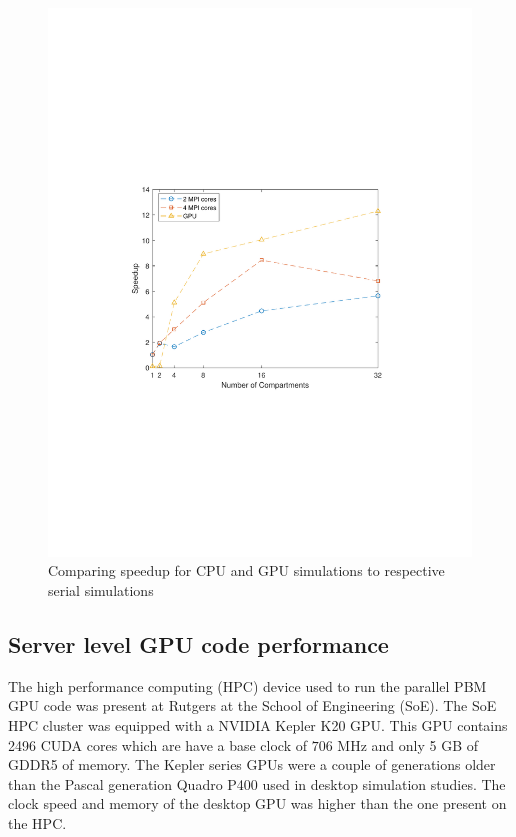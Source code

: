 \documentclass[preprint,10pt,authoryear,review]{elsarticle}
\begin{document}
\begin{figure}[h]
\centering
\includegraphics[scale=0.7,trim=120 240 120 240, clip]{speedup_desktop.pdf}
\caption{Comparing speedup for CPU and GPU simulations to respective serial simulations}
\label{fig:res_desktop_speedup}
\end{figure}



\subsection{Server level GPU code performance}
The high performance computing (HPC) device used to run the parallel PBM GPU code 
was present at Rutgers at the School of Engineering (SoE). The SoE HPC cluster was 
equipped with a NVIDIA Kepler K20 GPU. This GPU contains 2496 CUDA cores which are 
have a base clock of $706$ MHz and only 5 GB of GDDR5 of memory. The Kepler series 
GPUs were a couple of generations older than the Pascal generation Quadro P400 used 
in desktop simulation studies. The clock speed and memory of the desktop GPU was 
higher than the one present on the HPC. 
\end{document}
